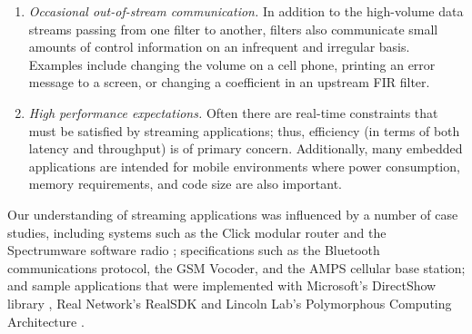 \begin{enumerate}
\item {\it Occasional out-of-stream communication.}  In addition to
the high-volume data streams passing from one filter to another,
filters also communicate small amounts of control information on an
infrequent and irregular basis.  Examples include changing the volume
on a cell phone, printing an error message to a screen, or changing a
coefficient in an upstream FIR filter.

\item {\it High performance expectations.}  Often there are real-time
constraints that must be satisfied by streaming applications; thus,
efficiency (in terms of both latency and throughput) is of primary
concern.  Additionally, many embedded applications are intended for
mobile environments where power consumption, memory requirements, and
code size are also important.
\end{enumerate}

Our understanding of streaming applications was influenced by a number
of case studies, including systems such as the Click modular router
\cite{click} and the Spectrumware software radio
\cite{spectrumware,softwareradio}; specifications such as the
Bluetooth communications protocol, the GSM Vocoder, and the AMPS
cellular base station; and sample applications that were implemented
with Microsoft's DirectShow library \cite{directshow}, Real Network's
RealSDK \cite{realsdk} and Lincoln Lab's Polymorphous Computing
Architecture \cite{pca}.



 





